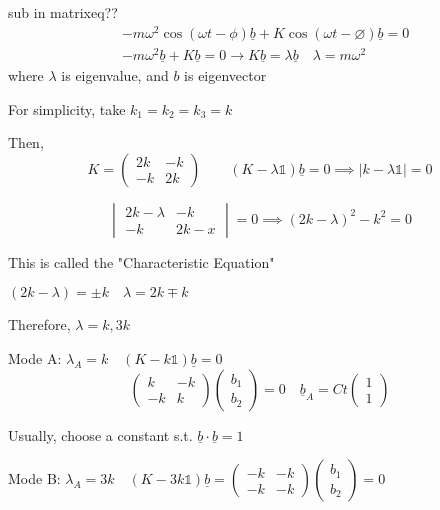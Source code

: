\documentclass{article}
\begin{document}
sub in matrixeq??
\begin{align*}
    &-m \omega^{2} \cos(\omega t - \phi) \underline{b} + K \cos(\omega t - \varnothing) \underline{b} = 0\\
    & -m \omega^{2} \underline{b} + K \underline{b} = 0 \to K \underline{b} = \lambda \underline{b} \quad \lambda = m \omega^{2}
\end{align*}
where $\lambda$ is eigenvalue, and $b$ is eigenvector

For simplicity, take $k_{1} = k_{2} = k_{3} = k$

Then,
\[K = \begin{pmatrix}
    2k & -k \\
    -k & 2k
\end{pmatrix} \qquad (K - \lambda \mathbb{1}) \underline{b} = 0 \implies \lvert k - \lambda \mathbb{1} \rvert = 0\]

\[\begin{vmatrix}
    2k - \lambda & -k \\
    -k & 2k - x
\end{vmatrix} = 0 \implies (2k - \lambda)^{2} - k^{2} = 0\]

This is called the "Characteristic Equation"

$(2k - \lambda) = \pm k \quad \lambda = 2k \mp k$

Therefore, $\lambda = k, 3k$

Mode A: $\lambda_{A} = k \quad (K - k \mathbb{1}) \underline{b} = 0$
\[\begin{pmatrix}
    k & -k \\
    -k & k
\end{pmatrix} \begin{pmatrix}
    b_{1} \\
    b_{2}
\end{pmatrix} = 0 \quad \underline{b}_{A} = Ct \begin{pmatrix}
    1 \\
    1
\end{pmatrix}\]

Usually, choose a constant s.t. $\underline{b} \cdot \underline{b} = 1$

Mode B: $\lambda_{A} = 3k \quad (K - 3k \mathbb{1}) \underline{b} = \begin{pmatrix}
    -k & -k \\
    -k & -k
\end{pmatrix}\begin{pmatrix}
    b_{1} \\
    b_{2}
\end{pmatrix} = 0$
\end{document}
